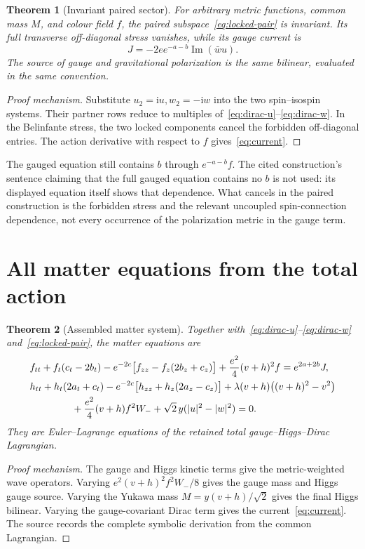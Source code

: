 \documentclass[11pt,a4paper,oneside]{book}
\theoremstyle{plain}
\newtheorem{theorem}{Theorem}[chapter]
\theoremstyle{definition}
\theoremstyle{remark}
\newcommand{\ii}{\mathrm i}
\newcommand{\src}[2]{\cite{#1}}
\begin{document}
\begin{theorem}[Invariant paired sector]
\label{thm:paired}
For arbitrary metric functions, common mass $M$, and colour field $f$, the paired subspace~\eqref{eq:locked-pair} is invariant. Its full transverse off-diagonal stress vanishes, while its gauge current is
\begin{equation}
 J=-2e e^{-a-b}\operatorname{Im}(\bar wu).
 \label{eq:current}
\end{equation}
The source of gauge and gravitational polarization is the same bilinear, evaluated in the same convention.
\end{theorem}
\begin{proof}[Proof mechanism]
Substitute $u_2=\ii u,w_2=-\ii w$ into the two spin--isospin systems. Their partner rows reduce to multiples of~\eqref{eq:dirac-u}--\eqref{eq:dirac-w}. In the Belinfante stress, the two locked components cancel the forbidden off-diagonal entries. The action derivative with respect to $f$ gives~\eqref{eq:current}.
\end{proof}
\src{R20}{thm:v20v18-paired}
The gauged equation still contains $b$ through $e^{-a-b}f$. The cited construction's sentence claiming that the full gauged equation contains no $b$ is not used: its displayed equation itself shows that dependence. What cancels in the paired construction is the forbidden stress and the relevant uncoupled spin-connection dependence, not every occurrence of the polarization metric in the gauge term.

\section{All matter equations from the total action}
\begin{theorem}[Assembled matter system]
\label{thm:toy-matter}
Together with~\eqref{eq:dirac-u}--\eqref{eq:dirac-w} and~\eqref{eq:locked-pair}, the matter equations are
\begin{align}
 &f_{tt}+f_t(c_t-2b_t)
 -e^{-2c}\bigl[f_{zz}-f_z(2b_z+c_z)\bigr]
 +\frac{e^2}{4}(v+h)^2f=e^{2a+2b}J,
 \label{eq:full-f}\\
 &h_{tt}+h_t(2a_t+c_t)
 -e^{-2c}\bigl[h_{zz}+h_z(2a_z-c_z)\bigr]
 +\lambda(v+h)\bigl((v+h)^2-v^2\bigr)\nonumber\\
 &\hspace{15mm}+\frac{e^2}{4}(v+h)f^2W_-
 +\sqrt2\,y(|u|^2-|w|^2)=0.
 \label{eq:full-h}
\end{align}
They are Euler--Lagrange equations of the retained total gauge--Higgs--Dirac Lagrangian.
\end{theorem}
\begin{proof}[Proof mechanism]
The gauge and Higgs kinetic terms give the metric-weighted wave operators. Varying $e^2(v+h)^2f^2W_-/8$ gives the gauge mass and Higgs gauge source. Varying the Yukawa mass $M=y(v+h)/\sqrt2$ gives the final Higgs bilinear. Varying the gauge-covariant Dirac term gives the current~\eqref{eq:current}. The source records the complete symbolic derivation from the common Lagrangian.
\end{proof}
\src{R20}{thm:v20v24-matter}
\end{document}
